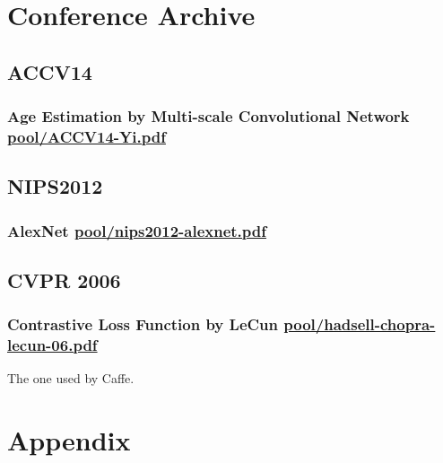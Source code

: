 \documentclass[a4paper,10pt,twocolumn]{report}
\newcommand{\arxiv}[2]{
 \section{{#2} \href{{#1}}{#1}}
}
\begin{document}
\part{Conference Archive}

 \chapter{ACCV14}

  \arxiv{pool/ACCV14-Yi.pdf}{Age Estimation by Multi-scale Convolutional Network}

 \chapter{NIPS2012}

  \arxiv{pool/nips2012-alexnet.pdf}{AlexNet}

 \chapter{CVPR 2006}

  \arxiv{pool/hadsell-chopra-lecun-06.pdf}{Contrastive Loss Function by LeCun}
  The one used by Caffe.

\part{Appendix}

\end{document}
